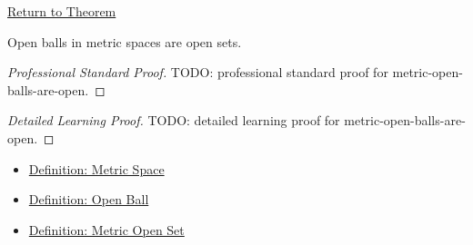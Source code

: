 \newpage
{}
\label{prf:metric-open-balls-are-open}

\begin{remark*}[Return]
\hyperref[thm:metric-open-balls-are-open]{Return to Theorem}
\end{remark*}

\begin{theorem*}
Open balls in metric spaces are open sets.
\end{theorem*}

\begin{proof}[Professional Standard Proof]
\LRAProofBodyStart
TODO: professional standard proof for metric-open-balls-are-open.
\end{proof}

\begin{proof}[Detailed Learning Proof]
\LRAProofBodyStart
TODO: detailed learning proof for metric-open-balls-are-open.
\end{proof}

\begin{remark*}
\end{remark*}

\begin{dependencies}
\begin{itemize}
  \item \hyperref[def:metric-space]{Definition: Metric Space}
  \item \hyperref[def:metric-open-ball]{Definition: Open Ball}
  \item \hyperref[def:metric-open-set]{Definition: Metric Open Set}
\end{itemize}
\end{dependencies}

\clearpage
